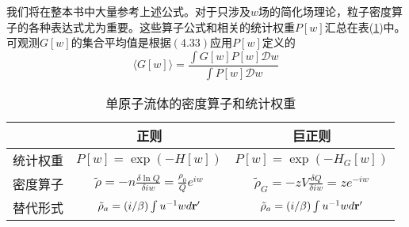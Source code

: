 我们将在整本书中大量参考上述公式。对于只涉及$ w$场的简化场理论，粒子密度算子的各种表达式尤为重要。这些算子公式和相关的统计权重$P[ w ]$汇总在表(\ref{4.1})中。可观测$G[ w]$的集合平均值是根据$(4.33)$应用$P[ w]$定义的\\
\begin{equation}
\langle G[w] \rangle = \frac{\int G[w]P[w]\mathcal{D}w}{\int P[w]\mathcal{D}w}
\end{equation}
\begin{table}[H]
	\centering   
	\caption{单原子流体的密度算子和统计权重}
	\label{4.1}
       \begin{tabular}{c c c}
       \hline
       ~&正则&巨正则 \\
       \hline
统计权重&$P[w]=\exp (-H[w])$&$P[w]=\exp (-H_{G}[w])$ \\
\hline
密度算子&$\tilde{\rho}=-n \frac{\delta \ln Q}{\delta iw}=\frac{\rho_{0}}{Q}e^{iw}$ & $\tilde{\rho}_{G}=-zV\frac{\delta Q}{\delta iw}=ze^{-iw}$\\
\hline
替代形式&$\tilde{\rho}_{a}=(i/\beta)\int u^{-1}w d\mathbf{r}'$ & $\tilde{\rho}_{a}=(i/\beta)\int u^{-1}w d\mathbf{r}'$\\
\end {tabular}
\end{table}


